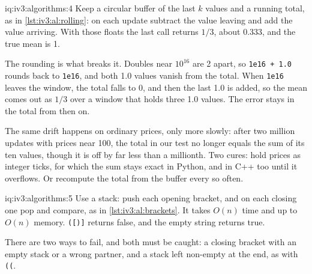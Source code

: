 \begin{solution}{iq:iv3:algorithms:4}
Keep a circular buffer of the last $k$ values and a running total, as in \cref{lst:iv3:al:rolling}: on each update subtract the value leaving and add the value arriving. With those floats the last call returns $1/3$, about 0.333, and the true mean is 1.
\label{lst:iv3:al:rolling}

The rounding is what breaks it. Doubles near $10^{16}$ are 2 apart, so \texttt{1e16 + 1.0} rounds back to \texttt{1e16}, and both 1.0 values vanish from the total. When \texttt{1e16} leaves the window, the total falls to 0, and then the last 1.0 is added, so the mean comes out as $1/3$ over a window that holds three 1.0 values. The error stays in the total from then on.

The same drift happens on ordinary prices, only more slowly: after two million updates with prices near 100, the total in our test no longer equals the sum of its ten values, though it is off by far less than a millionth. Two cures: hold prices as integer ticks, for which the sum stays exact in Python, and in C++ too until it overflows. Or recompute the total from the buffer every so often.

\end{solution}

\begin{solution}{iq:iv3:algorithms:5}
Use a stack: push each opening bracket, and on each closing one pop and compare, as in \cref{lst:iv3:al:brackets}. It takes $O(n)$ time and up to $O(n)$ memory. \texttt{([)]} returns false, and the empty string returns true.
\label{lst:iv3:al:brackets}

There are two ways to fail, and both must be caught: a closing bracket with an empty stack or a wrong partner, and a stack left non-empty at the end, as with \texttt{((}.

\end{solution}

